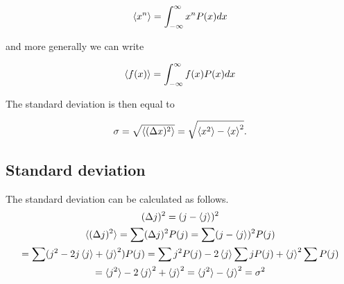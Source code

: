 \documentclass{article}
\numberwithin{theorem}{subsection}
\numberwithin{theorem}{subsubsection}
\theoremstyle{definition}
\numberwithin{definition}{subsection}
\numberwithin{definition}{subsubsection}
\begin{document}
\begin{gather*}
    \braket{x^n} = \int_{-\infty}^{\infty} x^n P(x) dx
\end{gather*}

\noindent and more generally we can write

\begin{gather*}
    \braket{f(x)} = \int_{-\infty}^{\infty} f(x) P(x) dx
\end{gather*}

\indent The standard deviation is then equal to

\begin{gather*}
    \sigma = \sqrt{\braket{(\Delta x)^{2}}} = \sqrt{\braket{x^2} - \braket{x}^2}. 
\end{gather*}

\subsection{Standard deviation}

The standard deviation can be calculated as follows.
\begin{gather*}
    (\Delta j)^2 = (j - \braket{j})^2 \\
    \braket{(\Delta j)^{2}} = \sum (\Delta j)^2 P(j) = \sum (j-\braket{j})^2 P(j) \\
    = \sum (j^2 - 2j\braket{j} + \braket{j}^2) P(j) = \sum j^2 P(j) - 2\braket{j}\sum j P(j) + \braket{j}^2 \sum P(j) \\
    = \braket{j^2} - 2\braket{j}^2 + \braket{j}^2 = \braket{j^2} - \braket{j}^2 = \sigma^{2}
\end{gather*}
\end{document}
